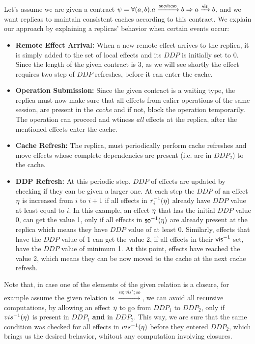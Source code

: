 Let's assume we are given a contract $\psi=\forall (a,b). a
\xrightarrow{{\normalfont \textsf{so}};{\normalfont \textsf{vis}};{\normalfont \textsf{so}}}b \Rightarrow a \xrightarrow{{\normalfont \textsf{vis}}} b$, and
we want replicas to maintain consistent caches according to this
contract. We explain our approach by
explaining a replicas' behavior when certain events occur: 
\begin{itemize}
\item {\bf Remote Effect Arrival:} When a new remote effect arrives to the
replica, it is simply added to the set of local effects and 
its $DDP$ is initially set to 0. Since the length of the
given contract is 3, as we will see shortly the effect requires two step
of $DDP$ refreshes, before it can enter the cache.
\item {\bf Operation Submission: } Since the given contract is a waiting
type, the replica must now make sure that all effects from ealier
operations of the same session, are present in the \emph{cache} and if
not, 
block the operation temporarily. The operation can proceed and
wtiness \emph{all} effects at the replica, after the mentioned effects enter
the cache.
\item {\bf Cache Refresh: } The replica, must periodically perform 
cache refreshes and move effects whose complete dependencies are present (i.e.
are in $DDP_2$) to the cache. 
\item {\bf DDP Refresh: } At this periodic step, $DDP$ of effects are
updated by checking if they can be given a larger one. 
At each step the $DDP$ of an effect $\eta$ is increased from $i$ to $i+1$ if
all effects in $r_i^{-1}(\eta)$ already have $DDP$ value at least equal to $i$.
In this example, an effect $\eta$ that has the initial $DDP$ value 0, can get
the value 1, only if all effects in  ${\normalfont \textsf{so}}^{-1}(\eta)$ are already
present at the replica which means they have $DDP$ value of at least 0.
Similarly, effects that have the $DDP$ value of 1 can get the value 2,
if all effects in their ${\normalfont \textsf{vis}}^{-1}$ set, have the $DDP$ value of
minimum 1. At this point, effects have reached the value 2, which means
they can be now moved to the cache at the next cache refresh.
\end{itemize}
Note that, in case one of the elements of the given relation is a
closure, for example assume the given relation is $\xrightarrow{so;vis^*;so}$,
we can avoid all recursive computations, by allowing an effect $\eta$
to go from $DDP_1$ to $DDP_2$, only if $vis^{-1}(\eta)$ is present in
$DDP_1$ {\bf and} in $DDP_2$. This way, we are sure that the same
condition was checked for all effects in $vis^{-1}(\eta)$ before they
entered $DDP_2$, which brings us the desired behavior, whitout any
computation involving closures.




